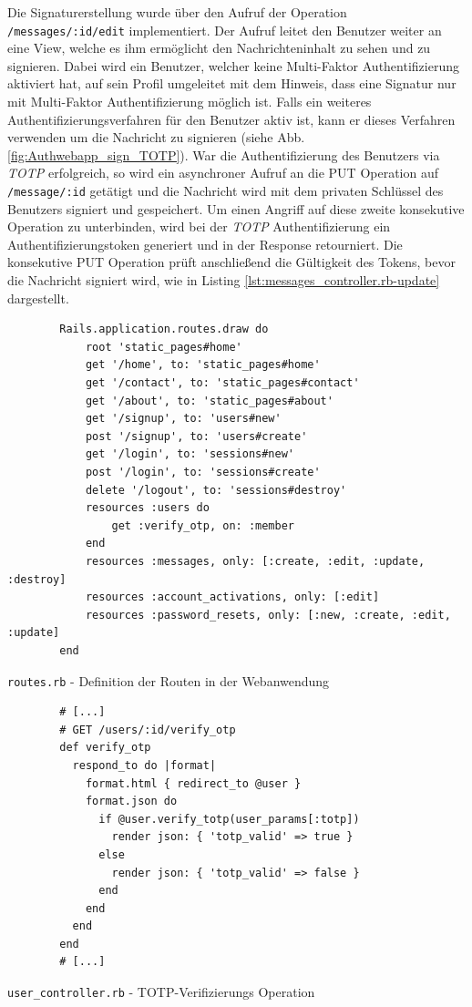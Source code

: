 \documentclass[11pt,a4paper,ngerman]{scrreprt}
\begin{document}
Die Signaturerstellung wurde über den Aufruf der Operation \texttt{/messages/:id/edit} implementiert. Der Aufruf leitet den Benutzer weiter an eine View, welche es ihm ermöglicht den Nachrichteninhalt zu sehen und zu signieren. Dabei wird ein Benutzer, welcher keine Multi-Faktor Authentifizierung aktiviert hat, auf sein Profil umgeleitet mit dem Hinweis, dass eine Signatur nur mit Multi-Faktor Authentifizierung möglich ist. Falls ein weiteres Authentifizierungsverfahren für den Benutzer aktiv ist, kann er dieses Verfahren verwenden um die Nachricht zu signieren (siehe Abb. \ref{fig:Authwebapp_sign_TOTP}). War die Authentifizierung des Benutzers via \textit{TOTP} erfolgreich, so wird ein asynchroner Aufruf an die PUT Operation auf \texttt{/message/:id} getätigt und die Nachricht wird mit dem privaten Schlüssel des Benutzers signiert und gespeichert. Um einen Angriff auf diese zweite konsekutive Operation zu unterbinden, wird bei der \textit{TOTP} Authentifizierung ein Authentifizierungstoken generiert und in der Response retourniert. Die konsekutive PUT Operation prüft anschließend die Gültigkeit des Tokens, bevor die Nachricht signiert wird, wie in Listing \ref{lst:messages_controller.rb-update} dargestellt.
\begin{listing}[htpb]
    \begin{verbatim}
        Rails.application.routes.draw do
            root 'static_pages#home'
            get '/home', to: 'static_pages#home'
            get '/contact', to: 'static_pages#contact'
            get '/about', to: 'static_pages#about'
            get '/signup', to: 'users#new'
            post '/signup', to: 'users#create'
            get '/login', to: 'sessions#new'
            post '/login', to: 'sessions#create'
            delete '/logout', to: 'sessions#destroy'
            resources :users do
                get :verify_otp, on: :member
            end
            resources :messages, only: [:create, :edit, :update, :destroy]
            resources :account_activations, only: [:edit]
            resources :password_resets, only: [:new, :create, :edit, :update]
        end
    \end{verbatim}
    \caption{\texttt{routes.rb} - Definition der Routen in der Webanwendung}
    \label{lst:routes.rb}
\end{listing}

\begin{listing}[htpb]
    \begin{verbatim}
        # [...]
        # GET /users/:id/verify_otp
        def verify_otp
          respond_to do |format|
            format.html { redirect_to @user }
            format.json do
              if @user.verify_totp(user_params[:totp])
                render json: { 'totp_valid' => true }
              else
                render json: { 'totp_valid' => false }
              end
            end
          end
        end
        # [...]
    \end{verbatim}
    \caption{\texttt{user\_controller.rb} - TOTP-Verifizierungs Operation}
    \label{lst:user-controller.rb-verify-otp}
\end{listing}
\end{document}
